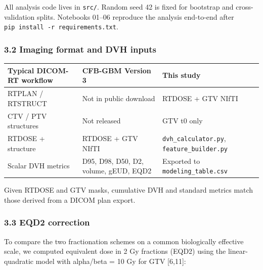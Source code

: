 \documentclass[
  11pt,
]{article}
\begin{document}
All analysis code lives in \texttt{src/}. Random seed 42 is fixed for
bootstrap and cross-validation splits. Notebooks 01--06 reproduce the
analysis end-to-end after \texttt{pip\ install\ -r\ requirements.txt}.

\subsubsection{3.2 Imaging format and DVH
inputs}\label{imaging-format-and-dvh-inputs}

\begin{longtable}[]{@{}
  >{\raggedright\arraybackslash}p{}
  >{\raggedright\arraybackslash}p{}
  >{\raggedright\arraybackslash}p{}@{}}
\toprule\noalign{}
\begin{minipage}[b]{\linewidth}\raggedright
Typical DICOM-RT workflow
\end{minipage} & \begin{minipage}[b]{\linewidth}\raggedright
CFB-GBM Version 3
\end{minipage} & \begin{minipage}[b]{\linewidth}\raggedright
This study
\end{minipage} \\
\midrule\noalign{}
\endhead
\bottomrule\noalign{}
\endlastfoot
RTPLAN / RTSTRUCT & Not in public download & RTDOSE + GTV NIfTI \\
CTV / PTV structures & Not released & GTV t0 only \\
RTDOSE + structure & RTDOSE + GTV NIfTI & \texttt{dvh\_calculator.py},
\texttt{feature\_builder.py} \\
Scalar DVH metrics & D95, D98, D50, D2, volume, gEUD, EQD2 & Exported to
\texttt{modeling\_table.csv} \\
\end{longtable}

Given RTDOSE and GTV masks, cumulative DVH and standard metrics match
those derived from a DICOM plan export.

\subsubsection{3.3 EQD2 correction}\label{eqd2-correction}

To compare the two fractionation schemes on a common biologically
effective scale, we computed equivalent dose in 2 Gy fractions (EQD2)
using the linear-quadratic model with alpha/beta = 10 Gy for GTV
{[}6,11{]}:
\end{document}
